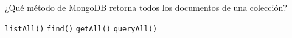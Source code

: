 \question[1] ¿Qué método de MongoDB retorna todos los documentos de una colección?
\begin{choices}
\choice \texttt{listAll()}
\CorrectChoice \texttt{find()}
\choice \texttt{getAll()}
\choice \texttt{queryAll()}
\end{choices}